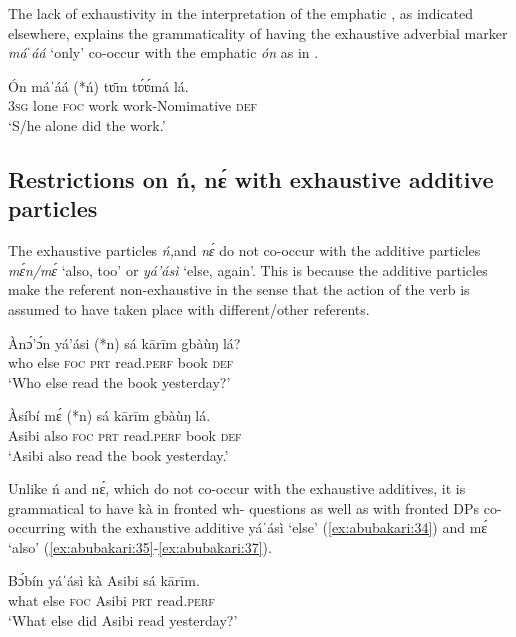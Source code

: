 \documentclass[output=paper
,newtxmath
,modfonts
,nonflat]{langsci/langscibook}
\begin{document}
The lack of exhaustivity in the interpretation of the emphatic , as indicated elsewhere, explains the grammaticality of having the exhaustive adverbial marker \textit{máˈáá} ‘only’ co-occur with the  emphatic  \textit{ón} as in .  

 
\ea\label{ex:abubakari:31} 
\gll \'{O}n  máˈáá    (*ń)  tʋ̄m  tʋ́ʋ́má      lá.\\
3\textsc{sg}  lone    \textsc{foc}  work  work-Nomimative  \textsc{def}\\
\glt ‘S/he alone did the work.’
\z

 
\subsection{Restrictions on ń, nɛ́ with exhaustive additive particles }\label{sec:abubakari:4.2}
 

 
The exhaustive  particles \textit{ń,}and \textit{nɛ́} do not co-occur with the additive particles \textit{mɛ́n/mɛ́} ‘also, too’ or \textit{yá’ásì} ‘else, again’. This is because the additive particles make the referent non-exhaustive in the sense that the action of the verb is assumed to have taken place with different/other referents.
 

\ea\label{ex:abubakari:32}
\gll Ànɔ́’ɔ́n	yá’ási	                                                           (*n)	sá	kārīm		gbàùŋ	lá?\\
who		else	\textsc{foc}	\textsc{prt}	read.\textsc{perf}	book		   \textsc{def}\\
\glt ‘Who else read the book yesterday?’
\z

\ea\label{ex:abubakari:32}
\gll Àsíbí	mɛ́    (*n)      sá     kārīm                gbàùŋ      lá.\\
Asibi	also   \textsc{foc}       \textsc{prt}     read.\textsc{perf}           book     \textsc{def} \\
\glt ‘Asibi also read the book yesterday.’
\z

Unlike ń and nɛ́, which do not co-occur with the exhaustive  additives, it is grammatical to have kà in fronted wh- questions as well as with fronted DPs co-occurring with the exhaustive  additive yáˈásì ‘else’  (\ref{ex:abubakari:34}) and mɛ́ ‘also’ (\ref{ex:abubakari:35}-\ref{ex:abubakari:37}).

\ea\label{ex:abubakari:33}
\gll Bɔ́bín		yáˈásì	kà	Asibi	sá	kārīm.\\
what		else	\textsc{foc}	Asibi	\textsc{prt}	read.\textsc{perf}\\
\glt ‘What else did Asibi read yesterday?’
\z
\end{document}
